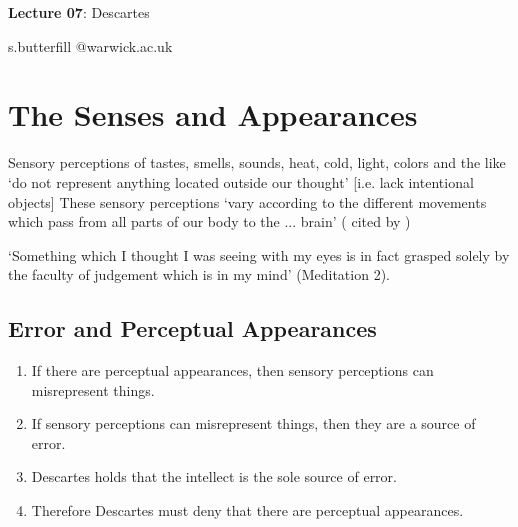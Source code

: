 \documentclass[12pt]{extarticle}
\date{}
\makeatletter
\def \ititle {Descartes}
\def \isubtitle {Lecture 02}
\def \iemail{s.butterfill @warwick.ac.uk}
\makeatother
\begin{document}
\begin{multicols*}{3}

\setlength\footnotesep{1em}









      
\def \ititle {Lecture 07}
 
\def \isubtitle {Descartes}
 
\begin{center}
 
{\Large
 
\textbf{\ititle}: \isubtitle
 
}
 
 
 
\iemail %
 
\end{center}
 
 
 
\section{The Senses and Appearances}
 
Sensory perceptions of tastes, smells, sounds, heat, cold, light, colors and the like ‘do not represent anything located outside our thought’  [i.e. lack intentional objects]
These sensory perceptions ‘vary according to the different movements which pass 
from all parts of our body to the ... brain’
(\citealp[p.~ 219, AT VIII:35]{descartes:1985_csm1} cited by \citealp[p.~348]{simmons:1999_are})
 
‘Something which I thought I was seeing with my eyes is in fact grasped solely by the faculty of
judgement which is in my mind’
(Meditation 2).


\subsection{Error and Perceptual Appearances}
\begin{enumerate}
\item If there are perceptual appearances, then sensory perceptions can misrepresent things.
\item If sensory perceptions can misrepresent things, then they are a source of error.
\item Descartes holds that the intellect is the sole source of error.
\item Therefore Descartes must deny that there are perceptual appearances.
\end{enumerate}


\end{multicols*}
\end{document}

